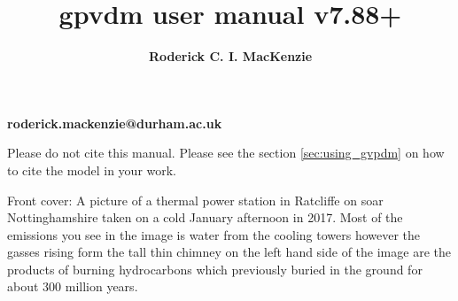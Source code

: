 \color{white}
\title{\Huge \textbf{gpvdm user manual v7.88+}}

\author{\textbf{Roderick C. I. MacKenzie}}


\maketitle



\setcounter{question}{0}


 \addtolength{\wpXoffset}{-10cm}

\centerline{\textbf{roderick.mackenzie@durham.ac.uk}}

\color{black}


\newpage

\ClearWallPaper

\vspace*{\fill}
Please do not cite this manual.  Please see the section \ref{sec:using_gvpdm} on how to cite the model in your work.
\vspace*{\fill}


Front cover: A picture of a thermal power station in Ratcliffe on soar Nottinghamshire taken on a cold January afternoon in 2017. Most of the emissions you see in the image is water from the cooling towers however the gasses rising form the tall thin chimney on the left hand side of the image are the products of burning hydrocarbons which previously buried in the ground for about 300 million years.

